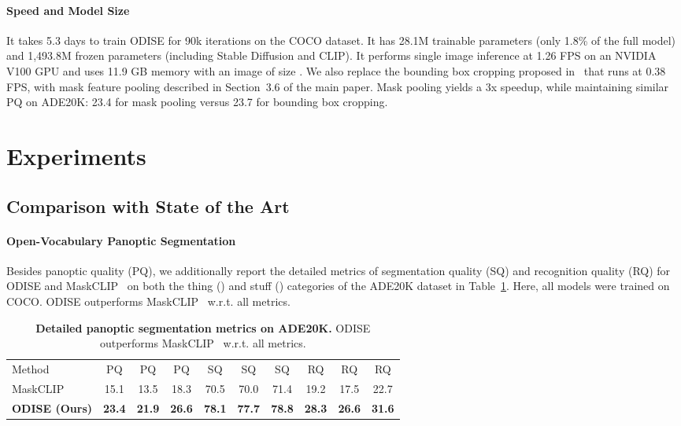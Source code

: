 \documentclass[10pt,twocolumn,letterpaper]{article}
\newcommand{\tablestyle}[2]{\setlength{\tabcolsep}{#1}\renewcommand{\arraystretch}{#2}\centering\small}
\newcommand{\ourmethod}{ODISE}
\begin{document}
\paragraph{Speed and Model Size}
It takes 5.3 days to train \ourmethod{} for 90k iterations on the COCO dataset. It has 28.1M trainable parameters (only 1.8\% of the full model) and 1,493.8M frozen parameters (including Stable Diffusion and CLIP).
It performs single image inference at 1.26 FPS on an NVIDIA V100 GPU and uses 11.9 GB memory with an image of size . We also replace the bounding box cropping proposed in~\cite{gu2021vild} that runs at 0.38 FPS, with mask feature pooling described in Section~3.6 of the main paper. Mask pooling yields a 3x speedup, while maintaining similar PQ on ADE20K: 23.4 for mask pooling versus 23.7 for bounding box cropping.

\section{Experiments}

\subsection{Comparison with State of the Art}
\paragraph{Open-Vocabulary Panoptic Segmentation}

Besides panoptic quality (PQ), we additionally report the detailed metrics of segmentation quality (SQ) and recognition quality (RQ) for \ourmethod{} and MaskCLIP~\cite{ding2022open} on both the thing () and stuff () categories of the ADE20K dataset in Table~\ref{tab:ade_breakdown}. Here, all models were trained on COCO. \ourmethod{} outperforms MaskCLIP~\cite{ding2022open} w.r.t. all metrics.


\begin{table}[!h]
\tablestyle{1.3pt}{1.1}
\begin{tabular}{l|ccc|ccc|ccc}
   Method                    & PQ   & PQ & PQ & SQ   & SQ & SQ & RQ   & RQ & RQ \\
   \shline
   MaskCLIP                  & 15.1          & 13.5             & 18.3             & 70.5          & 70.0             & 71.4             & 19.2          & 17.5             & 22.7             \\
   \textbf{\ourmethod{} (Ours)} & \textbf{23.4} & \textbf{21.9}    & \textbf{26.6}    & \textbf{78.1} & \textbf{77.7}    & \textbf{78.8}    & \textbf{28.3} & \textbf{26.6}    & \textbf{31.6}   
   \end{tabular}
   \vspace{-.5em}
   \caption{
      \label{tab:ade_breakdown}
      \textbf{Detailed panoptic segmentation metrics on ADE20K.} \ourmethod{} outperforms MaskCLIP~\cite{ding2022open} w.r.t. all metrics.
   }
   \vspace{-1em}
\end{table}
\end{document}
